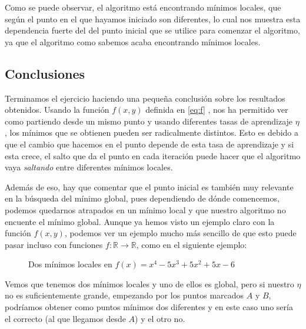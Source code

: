 \documentclass[12pt]{scrartcl}
\begin{document}
{Como se puede observar, el algoritmo está encontrando mínimos locales, que según el punto en el que hayamos iniciado son diferentes, lo cual nos muestra esta dependencia fuerte del del punto inicial que se utilice para comenzar el algoritmo, ya que el algoritmo
como sabemos acaba encontrando mínimos locales.


\subsection*{Conclusiones}

Terminamos el ejercicio haciendo una pequeña conclusión sobre los resultados obtenidos. Usando la función $f(x,y)$ definida en \eqref{eq:f} , nos ha permitido ver como partiendo desde un mismo punto y usando diferentes tasas de aprendizaje $\eta$, los mínimos que se obtienen
pueden ser radicalmente distintos. Esto es debido a que el cambio que hacemos en el punto depende de esta tasa de aprendizaje y si esta crece, el salto que da el punto en cada iteración puede hacer que el algoritmo vaya \emph{saltando} entre diferentes mínimos locales.

Además de eso, hay que comentar que el punto inicial es también muy relevante en la búsqueda del mínimo global, pues dependiendo de dónde comencemos, podemos quedarnos atrapados en un mínimo local y que nuestro algoritmo no encuente el mínimo global. Aunque ya hemos visto un ejemplo claro
con la función $f(x,y)$, podemos ver un ejemplo mucho más sencillo de que esto puede pasar incluso con funciones $f:\mathbb R \to  \mathbb R$, como en el siguiente ejemplo:

\begin{figure}[H]
\centering
{}
\caption{Dos mínimos locales en $f(x) = x^4 - 5 x^3 + 5 x^2 + 5 x - 6 $}
\end{figure}

Vemos que tenemos dos mínimos locales y uno de ellos es global, pero si nuestro $\eta$ no es suficientemente grande, empezando por los puntos marcados $A$ y $B$, podríamos obtener como puntos mínimos dos diferentes y en este caso uno sería el correcto (al que llegamos desde $A$) y el otro no.

}
\end{document}
